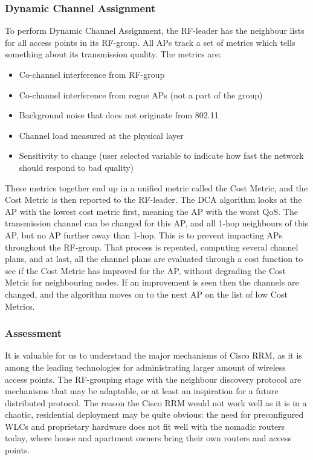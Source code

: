 \subsubsection{Dynamic Channel Assignment}
To perform Dynamic Channel Assignment, the RF-leader has the neighbour lists for all access points in 
its RF-group. All APs track a set of metrics which tells something about its transmission quality. The metrics are: 
\begin{itemize}
	\item Co-channel interference from RF-group
	\item Co-channel interference from rogue APs (not a part of the group)
	\item Background noise that does not originate from 802.11
	\item Channel load measured at the physical layer
	\item Sensitivity to change (user selected variable to indicate how fast the network should respond to bad quality)
\end{itemize}
These metrics together end up in a unified metric called the Cost Metric, and the Cost Metric is then reported to the RF-leader. 
The DCA algorithm looks at the AP with the lowest cost metric first, meaning the AP with the worst QoS. The transmission channel can be changed for
this AP, and all 1-hop neighbours of this AP, but no AP further away than 1-hop. This is to prevent impacting APs throughout the RF-group.
That process is repeated, computing several channel plans, and at last, all the channel plans are evaluated through a cost function
to see if the Cost Metric has improved for the AP, without degrading the Cost Metric for neighbouring nodes. If an improvement is seen
then the channels are changed, and the algorithm moves on to the next AP on the list of low Cost Metrics.  

\subsubsection{Assessment}
It is valuable for us to understand the major mechanisms of Cisco RRM, as it is among the leading technologies for administrating larger amount of wireless access points. 
The RF-grouping stage with the neighbour discovery protocol are mechanisms that may be adaptable, or at least an inspiration for a future distributed protocol. The reason 
the Cisco RRM would not work well as it is in a chaotic, residential deployment may be quite obvious: the need for preconfigured WLCs and proprietary hardware does not fit well with the nomadic 
routers today, where house and apartment owners bring their own routers and access points. 

